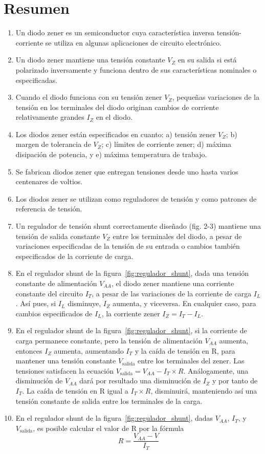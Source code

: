 \documentclass[12pt,a4paper]{article}
\begin{document}
\section*{Resumen}
\begin{enumerate}
    \item Un diodo zener es un semiconductor cuya característica inversa tensión-corriente se utiliza en algunas aplicaciones de circuito electrónico.
    \item Un diodo zener mantiene una tensión constante $V_Z$ en su salida si está polarizado inversamente y funciona dentro de sus características nominales o especificadas.
    \item Cuando el diodo funciona con su tensión zener $V_Z$, pequeñas variaciones de la tensión en los terminales del diodo originan cambios de corriente relativamente grandes $I_Z$ en el diodo.
    \item Los diodos zener están especificados en cuanto: a) tensión zener $V_Z$; b) margen de tolerancia de $V_Z$; c) límites de corriente zener; d) máxima disipación de potencia, y e) máxima temperatura de trabajo.
    \item Se fabrican diodos zener que entregan tensiones desde uno hasta varios centenares de voltios.
    \item Los diodos zener se utilizan como reguladores de tensión y como patrones de referencia de tensión.
    \item Un regulador de tensión shunt correctamente diseñado (fig. 2-3) mantiene una tensión de salida constante $V_Z$ entre los terminales del diodo, a pesar de variaciones especificadas de la tensión de su entrada o cambios también especificados de la corriente de carga.
    \item En el regulador shunt de la figura~\ref{fig:regulador_shunt}, dada una tensión constante de alimentación $V_{AA}$, el diodo zener mantiene una corriente constante del circuito $I_T$, a pesar de las variaciones de la corriente de carga $I_L$. Así pues, si $I_L$ disminuye, $I_Z$ aumenta, y viceversa. En cualquier caso, para cambios especificados de $I_L$, la corriente zener $I_Z = I_T - I_L$.
    \item En el regulador shunt de la figura~\ref{fig:regulador_shunt}, si la corriente de carga permanece constante, pero la tensión de alimentación $V_{AA}$ aumenta, entonces $I_Z$ aumenta, aumentando $I_T$ y la caída de tensión en R, para mantener una tensión constante $V_{\text{salida}}$ entre los terminales del zener. Las tensiones satisfacen la ecuación $V_{\text{salida}} = V_{AA} - I_T \times R$. Análogamente, una disminución de $V_{AA}$ dará por resultado una disminución de $I_Z$ y por tanto de $I_T$. La caída de tensión en R igual a $I_T \times R$, disminuirá, manteniendo así una tensión constante de salida entre los terminales de la carga.
    \item En el regulador shunt de la figura~\ref{fig:regulador_shunt}, dadas $V_{AA}$, $I_T$, y $V_{\text{salida}}$, es posible calcular el valor de R por la fórmula
    \[ R = \frac{V_{AA} - V}{I_T} \]
\end{enumerate}
\end{document}
